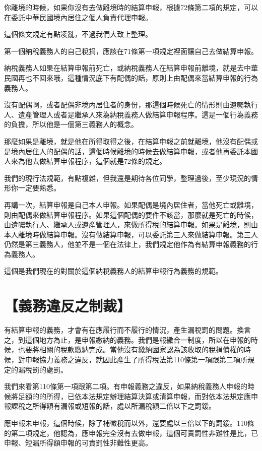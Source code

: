 \documentclass[]{ctexbook}
\begin{document}
你離境的時候，如果你沒有去做離境時的結算申報，根據72條第二項的規定，可以在委託中華民國境內居住之個人負責代理申報。

這個條文規定有點凌亂，不過我們大致上整理。

第一個納稅義務人的自己稅捐，應該在71條第一項規定裡面讓自己去做結算申報。

納稅義務人如果在結算申報前死亡，或納稅義務人在結算申報前離境，就是去中華民國再也不回來哦，這種情況底下有配偶的話，原則上由配偶來當結算申報的行為義務人。

沒有配偶啊，或者配偶非境內居住者的身份，那這個時候死亡的情形則由遺囑執行人、遺產管理人或者是繼承人來為納稅義務人做結算申報程序。這是一個行為義務的負擔，所以他是一個第三義務人的概念。

那麼如果是離境，就是他在所得取得之後，在結算申報之前就離境，他沒有配偶或是境內居住人的配偶的話，這個時候離境的時候去做結算申報，或者他再委託本國人來為他去做結算申報程序，這個就是72條的規定。

我們的現行法規範，有點複雜，但我還是期待各位同學，整理過後，至少現況的情形你一定要熟悉。

再講一次，結算申報是自己本人申報。如果配偶是境內居住者，當他死亡或離境，則由配偶來做結算申報程序。如果這個配偶的要件不該當，那麼就是死亡的時候，由遺囑執行人、繼承人或遺產管理人，來做所得稅的結算申報。如果是離境，則由本人離境時做結算申報。沒有做結算申報，可以委託第三人來做結算申報。第三人仍然是第三義務人，他並不是一個在法律上，我們規定他作為有結算申報義務的行為義務人。

這個是我們現在的對關於這個納稅義務人的結算申報行為義務的規範。

\hypertarget{ux7fa9ux52d9ux9055ux53cdux4e4bux5236ux88c1}{%
\section{【義務違反之制裁】}\label{ux7fa9ux52d9ux9055ux53cdux4e4bux5236ux88c1}}

有結算申報的義務，才會有在應履行而不履行的情況，產生漏稅罰的問題。換言之，到這個地方為止，是申報繳納的義務。我們是報繳合一制度，所以在申報的時候，也要將相關的稅款繳納完成。當他沒有繳納國家認為該收取的稅捐債權的時候，對申報協力義務之違反，就因此產生了所得稅法第110條第一項跟第二項所規定的漏稅罰的處罰。

我們來看第110條第一項跟第二項。有申報義務之違反，如果納稅義務人申報的時候將足額的的所得，已依本法規定辦理結算決算或清算申報，而對依本法規定應申報課稅之所得額有漏報或短報的話，處以所漏稅額二倍以下之罰鍰。

應申報未申報，這個時候，除了補徵稅而以外，還要處以三倍以下的罰鍰。110條的第二項規定，他認為，應申報完全沒有去做申報，這個可責罰性非難性是比，已申報、短漏所得額申報的可責罰性非難性更高。
\end{document}
